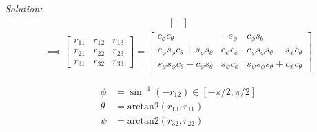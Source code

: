 \documentclass{article}
\newenvironment{solution}{\emph{Solution:}}{}
\begin{document}
\begin{solution}
\begin{align}
\begin{bmatrix}
  \end{bmatrix}
\end{align}
\begin{align}
  \implies \begin{bmatrix}
    r_{11} & r_{12} & r_{13}  \\
    r_{21} & r_{22} & r_{23}  \\
    r_{31} & r_{32} & r_{33}  
  \end{bmatrix}
  = \begin{bmatrix}
    c_\phi c_\theta & - s_\phi & c_\phi s_\theta \\
    c_\psi s_\phi c_\theta + s_\psi s_\theta &  c_\psi c_\phi & c_\psi s_\phi s_\theta  - s_\psi c_\theta \\
    s_\psi s_\phi c_\theta - c_\psi s_\theta & s_\psi c_\phi & s_\psi s_\phi s_\theta + c_\psi c_\theta
  \end{bmatrix}
\end{align}

\begin{align}
  \phi &= \sin^{-1}(-r_{12}) \in [-\pi/2, \pi/2]\\
  \theta &= \text{arctan2}(r_{13}, r_{11}) \\
  \psi &= \text{arctan2}(r_{32}, r_{22})
\end{align}
\end{solution}
\newpage
\end{document}
